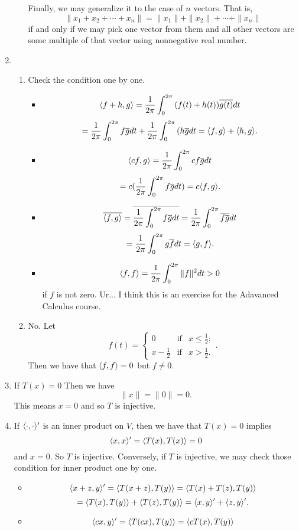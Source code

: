 \begin{enumerate}
\begin{enumerate}
Finally, we may generalize it to the case of $n$ vectors. That is, 
\[\|x_1+x_2+\cdots +x_n\|=\|x_1\|+\|x_2\|+\cdots +\|x_n\|\]
if and only if we may pick one vector from them and all other vectors are some multiple of that vector using nonnegative real number.
\end{enumerate}
\item \begin{enumerate}
\item Check the condition one by one.\begin{itemize}
\item \[\langle f+h,g\rangle=\frac{1}{2\pi}\int_0^{2\pi}{(f(t)+h(t))\overline{g(t)}dt}\]
\[=\frac{1}{2\pi}\int_0^{2\pi}{f\overline{g}dt}+\frac{1}{2\pi}\int_0^{2\pi}{(h\overline{g}dt}=\langle f,g\rangle +\langle h,g\rangle.\]
\item \[\langle cf,g\rangle=\frac{1}{2\pi}\int_0^{2\pi}{cf\overline{g}dt}\]
\[=c(\frac{1}{2\pi}\int_0^{2\pi}{f\overline{g}dt})=c\langle f,g\rangle .\]
\item \[\overline{\langle f,g\rangle}=\overline{\frac{1}{2\pi}\int_0^{2\pi}{f\overline{g}dt}}=\frac{1}{2\pi}\int_0^{2\pi}{\overline{f\overline{g}}dt}\]
\[=\frac{1}{2\pi}\int_0^{2\pi}{g\overline{f}dt}=\langle g,f\rangle.\]
\item \[\langle f,f\rangle =\frac{1}{2\pi}\int_0^{2\pi}{\|f\|^2dt}>0\]
if $f$ is not zero. Ur... I think this is an exercise for the Adavanced Calculus course.
\end{itemize}
\item No. Let 
\[f(t)=\left\{\begin{array}{ccc}0&\mathrm{if} &x\leq \frac{1}{2};\\x-\frac{1}{2}&\mathrm{if} &x>\frac{1}{2}.\end{array}\right..\]
Then we have that $\langle f,f\rangle=0$ but $f\neq 0$.
\end{enumerate}
\item If $T(x)=0$ Then we have 
\[\|x\|=\|0\|=0.\]
This means $x=0$ and so $T$ is injective.
\item If $\langle \cdot, \cdot \rangle'$ is an inner product on $V$, then we have that $T(x)=0$ implies 
\[\langle x,x\rangle'=\langle T(x),T(x)\rangle =0\]
and $x=0$. So $T$ is injective. Conversely, if $T$ is injective, we may check those condition for inner product one by one.
\begin{itemize}
\item \[\langle x+z,y\rangle'=\langle T(x+z),T(y)\rangle =\langle T(x)+T(z),T(y)\rangle\]
\[=\langle T(x),T(y)\rangle +\langle T(z),T(y)\rangle =\langle x,y\rangle' +\langle z,y\rangle' .\]
\item \[\langle cx,y\rangle'=\langle T(cx),T(y)\rangle =\langle cT(x),T(y)\rangle\]

\end{itemize}
\end{enumerate}
